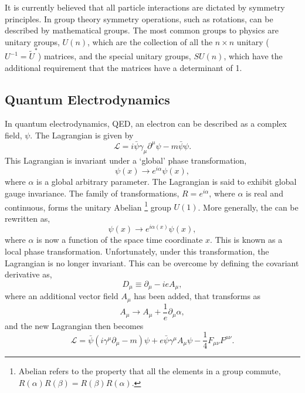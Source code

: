It is currently believed that all particle interactions are dictated by symmetry
principles.  In group theory symmetry operations, such as rotations, can be
described by mathematical groups.
The most common groups to physics are unitary groups, $U(n)$, which are the
collection of all the $n\times n$ unitary ($U^{-1} = \tilde{U}^{*}$) matrices, and
the special unitary groups, $SU(n)$, which have the additional requirement that
the matrices have a determinant of 1.

\subsection{Quantum Electrodynamics}
\label{sec:QED}
In quantum electrodynamics, QED, an electron can be described as a complex
field, $\psi$. The Lagrangian is given by
\begin{equation}
\mathcal{L} = i \bar{\psi} \gamma_{\mu} \partial^{\mu} \psi - m \bar{\psi}\psi .
\end{equation}
This Lagrangian is invariant under a `global' phase transformation,
\begin{equation}
\psi(x) \to e^{i\alpha} \psi(x),
\label{eq:global}
\end{equation}
where $\alpha$ is a global arbitrary parameter. The Lagrangian is said to exhibit
global gauge invariance. The family of transformations, $R =
e^{i \alpha}$, where $\alpha$ is real and continuous, forms the unitary
Abelian \footnote{Abelian refers to the property that all the elements in a
group commute, $R(\alpha)R(\beta) = R(\beta)R(\alpha)$.}
group $U(1)$. 
More generally, the  can be rewritten as,
\begin{equation}
\psi(x) \to e^{i\alpha(x)} \psi(x),
\label{eq:local}
\end{equation}
where $\alpha$ is now a function of the space time coordinate $x$. This is known
as a local phase transformation. Unfortunately, under this transformation, the
Lagrangian is no longer invariant. This can be overcome by defining the
covariant derivative as,
\begin{equation}
D_{\mu} \equiv \partial_{\mu} - i e A_{\mu},
\end{equation}
where an additional vector field $A_{\mu}$ has been added, that transforms as 
\begin{equation}
A_{\mu} \to A_{\mu} + \frac{1}{e} \partial_{\mu} \alpha,
\end{equation}
and the new Lagrangian then becomes
\begin{equation}
\mathcal{L} = 
\bar{\psi}(i\gamma^{\mu}\partial_{\mu} - m)\psi + 
e \bar{\psi} \gamma^{\mu} A_{\mu} \psi - 
\frac{1}{4} F_{\mu\nu} F^{\mu\nu}. 
\end{equation}
